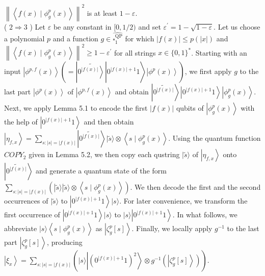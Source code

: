 \documentclass[10pt]{article}
\begin{document}
$\left\|\left\langle f(x) \mid \phi_{g}^{p}(x)\right\rangle\right\|^{2}$ is at least $1-\varepsilon$.\\
( $2 \Rightarrow 3$ ) Let $\varepsilon$ be any constant in $[0,1 / 2)$ and set $\varepsilon^{\prime}=1-\sqrt{1-\varepsilon}$. Let us choose a polynomial $p$ and a function $g \in \widehat{\square_{1}^{\mathrm{QP}}}$ for which $|f(x)| \leq p(|x|)$ and $\left\|\left\langle f(x) \mid \phi_{g}^{p}(x)\right\rangle\right\|^{2} \geq 1-\varepsilon^{\prime}$ for all strings $x \in\{0,1\}^{*}$. Starting with an input $\left.\left|\phi^{p, f}(x)\right\rangle\left(=\left|\widetilde{\left.0^{|f(x)|}\right\rangle}\right| 0^{|f(x)|+1} 1\right\rangle\left|\phi^{p}(x)\right\rangle\right)$, we first apply $g$ to the last part $\left|\phi^{p}(x)\right\rangle$ of $\left|\phi^{p, f}(x)\right\rangle$ and obtain $\left|\widetilde{0^{|f(x)|}}\right\rangle\left|0^{|f(x)|+1} 1\right\rangle\left|\phi_{g}^{p}(x)\right\rangle$. Next, we apply Lemma 5.1 to encode the first $|f(x)|$ qubits of $\left|\phi_{g}^{p}(x)\right\rangle$ with the help of $\left|0^{|f(x)|+1} 1\right\rangle$ and then obtain $\left|\eta_{f, x}\right\rangle=\sum_{s:|s|=|f(x)|}\left|\widetilde{0^{|f(x)|}}\right\rangle|\tilde{s}\rangle \otimes\left\langle s \mid \phi_{g}^{p}(x)\right\rangle$. Using the quantum function $C O P Y_{2}$ given in Lemma 5.2, we then copy each qustring $|\tilde{s}\rangle$ of $\left|\eta_{f, x}\right\rangle$ onto $\left|\widetilde{0^{|f(x)|}}\right\rangle$ and generate a quantum state of the form $\sum_{s:|s|=|f(x)|}\left(|\tilde{s}\rangle|\tilde{s}\rangle \otimes\left\langle s \mid \phi_{g}^{p}(x)\right\rangle\right)$. We then decode the first and the second occurrences of $|\tilde{s}\rangle$ to $\left|0^{|f(x)|+1} 1\right\rangle|s\rangle$. For later convenience, we transform the first occurrence of $\left|0^{|f(x)|+1} 1\right\rangle|s\rangle$ to $|s\rangle\left|0^{|f(x)|+1} 1\right\rangle$. In what follows, we abbreviate $|s\rangle\left\langle s \mid \phi_{g}^{p}(x)\right\rangle$ as $\left|\zeta_{g}^{p}[s]\right\rangle$. Finally, we locally apply $g^{-1}$ to the last part $\left|\zeta_{g}^{p}[s]\right\rangle$, producing $\left|\xi_{x}\right\rangle=\sum_{s:|s|=|f(x)|}\left(|s\rangle\left|\left(0^{|f(x)|+1} 1\right)^{2}\right\rangle \otimes g^{-1}\left(\left|\zeta_{g}^{p}[s]\right\rangle\right)\right)$.
\end{document}
